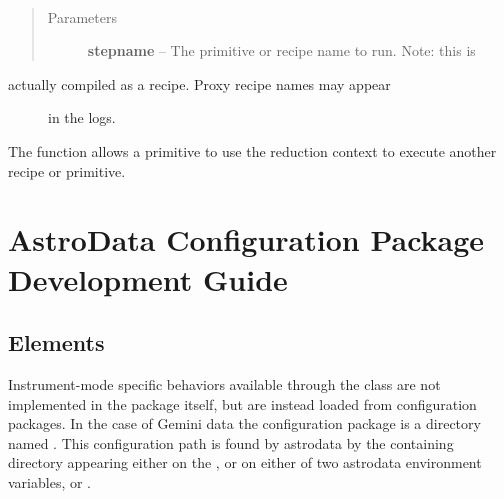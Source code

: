\documentclass[letterpaper,10pt,english]{sphinxmanual}
\begin{document}
\begin{fulllineitems}
\label{chapter_ReductionContextClass:astrodata.RecipeManager.ReductionContext.run}~\begin{quote}\begin{description}
\item[{Parameters}] \leavevmode
\textbf{stepname} -- The primitive or recipe name to run. Note: this is

\end{description}\end{quote}
\begin{description}
\item[{actually compiled as a recipe. Proxy recipe names may appear}] \leavevmode
in the logs.

\end{description}
\begin{quote}\begin{description}
\end{description}\end{quote}

The  function allows a primitive to use the reduction
context to execute another recipe or primitive.

\end{fulllineitems}



\chapter{AstroData Configuration Package Development Guide}
\label{developmentGuide:astrodata-configuration-package-development-guide}\label{developmentGuide::doc}

\section{Elements}
\label{configElements:elements}\label{configElements::doc}
Instrument-mode specific behaviors available through the  class
are not implemented in the  package itself, but are instead loaded from
configuration packages. In the case of Gemini data the
configuration package is a directory named .  This
configuration path is found by astrodata by the containing directory
appearing either on the , or on either of two astrodata environment
variables,  or .
\end{document}
